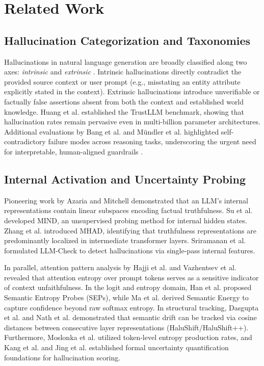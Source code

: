 \documentclass[journal]{IEEEtran}
\begin{document}
\section{Related Work}

\subsection{Hallucination Categorization and Taxonomies}
Hallucinations in natural language generation are broadly classified along two axes: \textit{intrinsic} and \textit{extrinsic} \cite{ji2023survey, zhang2025siren}. Intrinsic hallucinations directly contradict the provided source context or user prompt (e.g., misstating an entity attribute explicitly stated in the context). Extrinsic hallucinations introduce unverifiable or factually false assertions absent from both the context and established world knowledge. Huang et al. \cite{huang2024trustllm} established the TrustLLM benchmark, showing that hallucination rates remain pervasive even in multi-billion parameter architectures. Additional evaluations by Bang et al. \cite{bang2023multitask} and M{\"u}ndler et al. \cite{mundler2023self} highlighted self-contradictory failure modes across reasoning tasks, underscoring the urgent need for interpretable, human-aligned guardrails \cite{sharma2024trust, herrera2025xai}.

\subsection{Internal Activation and Uncertainty Probing}
Pioneering work by Azaria and Mitchell \cite{azaria2023internal} demonstrated that an LLM's internal representations contain linear subspaces encoding factual truthfulness. Su et al. \cite{su2024mind} developed MIND, an unsupervised probing method for internal hidden states. Zhang et al. \cite{zhang2025mhad} introduced MHAD, identifying that truthfulness representations are predominantly localized in intermediate transformer layers. Sriramanan et al. \cite{sriramanan2024llmcheck} formulated LLM-Check to detect hallucinations via single-pass internal features.

In parallel, attention pattern analysis by Hajji et al. \cite{hajji2025map} and Vazhentsev et al. \cite{vazhentsev2025uncertainty} revealed that attention entropy over prompt tokens serves as a sensitive indicator of context unfaithfulness. In the logit and entropy domain, Han et al. \cite{han2024semantic} proposed Semantic Entropy Probes (SEPs), while Ma et al. \cite{ma2024semantic} derived Semantic Energy to capture confidence beyond raw softmax entropy. In structural tracking, Dasgupta et al. \cite{dasgupta2025hallushift} and Nath et al. \cite{nath2025hallushift} demonstrated that semantic drift can be tracked via cosine distances between consecutive layer representations (HaluShift/HaluShift++). Furthermore, Moslonka et al. \cite{moslonka2025epr} utilized token-level entropy production rates, and Kang et al. \cite{kang2025uq} and Jing et al. \cite{jing2025faith} established formal uncertainty quantification foundations for hallucination scoring.
\end{document}
